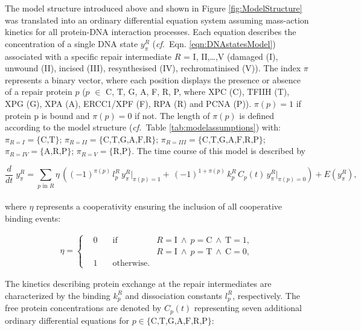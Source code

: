 The model structure introduced above and shown in Figure \ref{fig:ModelStructure} was translated into an ordinary differential equation system assuming mass-action kinetics for all protein-DNA interaction processes. Each equation describes the concentration of a single DNA state $y_{\pi}^{R}$ (\textit{cf.}\ Eqn. \ref{eqn:DNAstatesModel}) associated with a specific repair intermediate $R$ = I, II,\dots,V (damaged (I), unwound (II), incised (III), resynthesised (IV), rechromatinised (V)). The index $\pi$ represents a binary vector, where each position displays the presence or absence of a repair protein $p$ ($p$ $\in$ {C, T, G, A, F, R, P}, where XPC (C), TFIIH (T), XPG (G), XPA (A), ERCC1/XPF (F), RPA (R) and PCNA (P)). $\pi(p)=1$ if protein p is bound and $\pi(p)=0$ if not. The length of $\pi(p)$ is defined according to the model structure (\textit{cf.}\ Table \ref{tab:modelassumptions}) with: $\pi_{R=I} = \{ \text{C,T} \}$; $\pi_{R=II} = \{ \text{C,T,G,A,F,R} \}$; $\pi_{R=III} = \{ \text{C,T,G,A,F,R,P} \}$; $\pi_{R=IV} = \{ \text{A,R,P} \}$; $\pi_{R=V} = \{ \text{R,P} \}$. The time course of this model is described by

\begin{equation}\label{eqn:DNAstatesModel}
\frac{d}{dt}\;y_{\pi}^{R} =\sum_{p\text{ in }R}\eta \, \left( (-1)^{\pi(p)} \,l_{p}^{ R}\, y_{\pi}^{R}\left. \right|_{\pi(p)=1}+  \, (-1)^{1+\pi(p)}\, k_{p}^{ R} \,C_p(t)\,y_{\pi}^{R}\left. \right|_{\pi(p)=0}\right ) +E(y_{\pi}^{R}),
\end{equation}\\
where $\eta$ represents a cooperativity ensuring the inclusion of all cooperative binding events:

\begin{align*}
\eta =\left\{
\begin{array}{llll}
& 0 \quad   &\text{if}& R=\text{I} ~\wedge~ p=\text{C} ~\wedge~ \text{T}=1, \\
&     && R=\text{I} ~\wedge~ p=\text{T} ~\wedge~ \text{C}=0,\\
& 1 \quad &\text{otherwise}.&
\end{array}
\right.
\end{align*}
  
The kinetics describing protein exchange at the repair intermediates are characterized by the binding $k_{p}^{ R}$ and dissociation constants $l_{p}^{ R}$, respectively. The free protein concentrations are denoted by $C_p(t)$ representing seven additional ordinary differential equations for $p \in \{\text{C,T,G,A,F,R,P}\}$:

